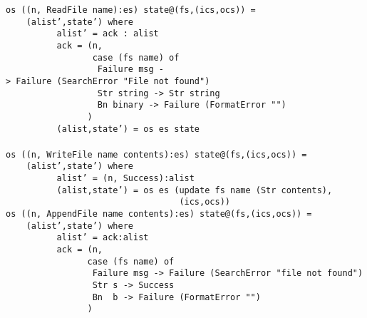 \eprogNoSkip
\bprog
\mbox{\tt os\ ((n,\ ReadFile\ name):es)\ state@(fs,(ics,ocs))\ =}\\
\mbox{\tt \ \ \ \ (alist',state')\ where}\\
\mbox{\tt \ \ \ \ \ \ \ \ \ \ alist'\ =\ ack\ :\ alist}\\
\mbox{\tt \ \ \ \ \ \ \ \ \ \ ack\ =\ (n,}\\
\mbox{\tt \ \ \ \ \ \ \ \ \ \ \ \ \ \ \ \ \ case\ (fs\ name)\ of}\\
\mbox{\tt \ \ \ \ \ \ \ \ \ \ \ \ \ \ \ \ \ \ Failure\ msg\ ->\ Failure\ (SearchError\ "File\ not\ found")}\\
\mbox{\tt \ \ \ \ \ \ \ \ \ \ \ \ \ \ \ \ \ \ Str\ string\ ->\ Str\ string}\\
\mbox{\tt \ \ \ \ \ \ \ \ \ \ \ \ \ \ \ \ \ \ Bn\ binary\ ->\ Failure\ (FormatError\ "")}\\
\mbox{\tt \ \ \ \ \ \ \ \ \ \ \ \ \ \ \ \ )}\\
\mbox{\tt \ \ \ \ \ \ \ \ \ \ (alist,state')\ =\ os\ es\ state}\\
\mbox{\tt }\\[-8pt]
\mbox{\tt os\ ((n,\ WriteFile\ name\ contents):es)\ state@(fs,(ics,ocs))\ =}\\
\mbox{\tt \ \ \ \ (alist',state')\ where}\\
\mbox{\tt \ \ \ \ \ \ \ \ \ \ alist'\ =\ (n,\ Success):alist}\\
\mbox{\tt \ \ \ \ \ \ \ \ \ \ (alist,state')\ =\ os\ es\ (update\ fs\ name\ (Str\ contents),}\\
\mbox{\tt \ \ \ \ \ \ \ \ \ \ \ \ \ \ \ \ \ \ \ \ \ \ \ \ \ \ \ \ \ \ \ \ \ \ (ics,ocs))}
\eprogNoSkip
\bprog
\mbox{\tt os\ ((n,\ AppendFile\ name\ contents):es)\ state@(fs,(ics,ocs))\ =}\\
\mbox{\tt \ \ \ \ (alist',state')\ where}\\
\mbox{\tt \ \ \ \ \ \ \ \ \ \ alist'\ =\ ack:alist}\\
\mbox{\tt \ \ \ \ \ \ \ \ \ \ ack\ =\ (n,\ }\\
\mbox{\tt \ \ \ \ \ \ \ \ \ \ \ \ \ \ \ \ case\ (fs\ name)\ of}\\
\mbox{\tt \ \ \ \ \ \ \ \ \ \ \ \ \ \ \ \ \ Failure\ msg\ ->\ Failure\ (SearchError\ "file\ not\ found")}\\
\mbox{\tt \ \ \ \ \ \ \ \ \ \ \ \ \ \ \ \ \ Str\ s\ ->\ Success}\\
\mbox{\tt \ \ \ \ \ \ \ \ \ \ \ \ \ \ \ \ \ Bn\ \ b\ ->\ Failure\ (FormatError\ "")}\\
\mbox{\tt \ \ \ \ \ \ \ \ \ \ \ \ \ \ \ \ )}\\
